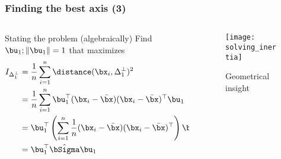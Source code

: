 \begin{frame}
  \frametitle{Finding the best axis (3)}

\begin{columns}
  \begin{column}{.5\textwidth}
  \begin{block}{Stating the problem (algebraically)}
    Find $\bu_1; \|\bu_1 \|=1$ that maximizes
    \begin{equation*}
      \begin{aligned}
        I_{\Delta_1^\bot} & = \frac{1}{n}\sum_{i=1}^n \distance(\bx_i,\Delta_1^\bot)^2 \\ 
        & = \frac{1}{n}\sum_{i=1}^n \bu_1^\top (\bx_i - \bar{\bx})(\bx_i - \bar{\bx})^\top \bu_1 \\
        & = \bu_1^\top \left( \sum_{i=1}^n \frac{1}{n}(\bx_i - \bar{\bx})(\bx_i - \bar{\bx})^\top \right)  \bu_1 \\
        & = \bu_1^\top \hat{\bSigma}  \bu_1
      \end{aligned}
    \end{equation*} 
  \end{block}  
  \end{column}
  \begin{column}{.45\textwidth}
  \begin{figure}
    \texttt{[image: solving\_inertia]}
    \caption{Geometrical insight}
  \end{figure}
  \end{column}
\end{columns}
  
\end{frame}

